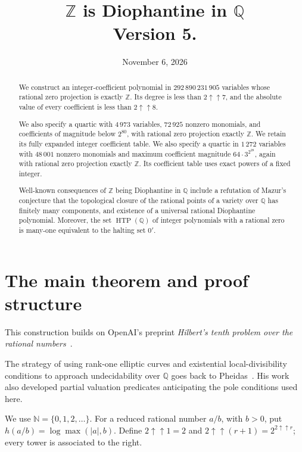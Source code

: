 \documentclass[11pt]{article}
\title{$\mathbb{Z}$ is Diophantine in $\mathbb{Q}$\\[4pt]\large Version 5.}
\author{}
\date{November 6, 2026}
\theoremstyle{definition}
\theoremstyle{remark}
\newcommand{\Q}{\mathbb Q}
\newcommand{\Z}{\mathbb Z}
\newcommand{\N}{\mathbb N}
\newcommand{\tw}[1]{2\mathbin{\uparrow\!\uparrow}#1}
\begin{document}
\maketitle
\begin{abstract}
We construct an integer-coefficient polynomial in
$292\,890\,231\,905$ variables whose rational zero projection is exactly
$\Z$. Its degree is less than $2\mathbin{\uparrow\!\uparrow}7$, and the
absolute value of every coefficient is less than
$2\mathbin{\uparrow\!\uparrow}8$.

We also specify a quartic with $4\,973$ variables, $72\,925$ nonzero monomials, and coefficients of magnitude below $2^{80}$,
with rational zero projection exactly $\Z$. We retain its fully expanded
integer coefficient table. We also specify a quartic in $1\,272$ variables
with $48\,001$ nonzero monomials and maximum coefficient magnitude
$64\cdot 3^{2^{28}}$, again with rational zero projection exactly $\Z$.
Its coefficient table uses exact powers of a fixed integer.

Well-known consequences of $\Z$ being Diophantine in $\Q$ include a refutation of Mazur's conjecture that the topological closure of the rational points of a variety over $\Q$ has finitely many components, and existence of a universal rational Diophantine polynomial. Moreover, the set $\operatorname{HTP}(\Q)$ of integer polynomials with a rational zero is many-one equivalent to the halting set $0'$.
\end{abstract}
\tableofcontents

\section{The main theorem and proof structure}\label{sec:main}
This construction builds on OpenAI's preprint
\emph{Hilbert's tenth problem over the rational numbers}~\cite{openaihtp}.

The strategy of using rank-one elliptic curves and existential
local-divisibility conditions to approach undecidability over $\Q$
goes back to Pheidas~\cite{pheidas2000}. His work also developed
partial valuation predicates anticipating the pole conditions used here.

We use $\N=\{0,1,2,\ldots\}$. For a reduced rational number $a/b$, with
$b>0$, put $h(a/b)=\log\max(|a|,b)$. Define $\tw1=2$ and
$\tw{(r+1)}=2^{\tw r}$; every tower is associated to the right.
\end{document}
